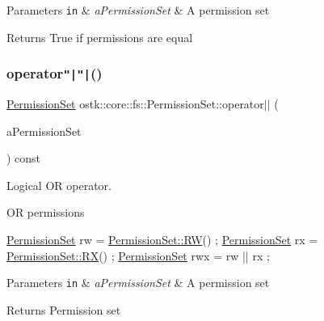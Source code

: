 \begin{DoxyParams}[1]{Parameters}
\mbox{\tt in}  & {\em a\+Permission\+Set} & A permission set \\
\hline
\end{DoxyParams}
\begin{DoxyReturn}{Returns}
True if permissions are equal 
\end{DoxyReturn}
\mbox{\label{classostk_1_1core_1_1fs_1_1_permission_set_a05e00b9a8eb5d7721f413a1b54e15038}} 
\subsubsection{\texorpdfstring{operator\texttt{"|}\texttt{"|}()}{operator||()}}
{\footnotesize\ttfamily \hyperlink{classostk_1_1core_1_1fs_1_1_permission_set}{Permission\+Set} ostk\+::core\+::fs\+::\+Permission\+Set\+::operator$\vert$$\vert$ (\begin{DoxyParamCaption}\item[{const \hyperlink{classostk_1_1core_1_1fs_1_1_permission_set}{Permission\+Set} \&}]{a\+Permission\+Set }\end{DoxyParamCaption}) const}



Logical OR operator. 

OR permissions


\begin{DoxyCode}
\hyperlink{classostk_1_1core_1_1fs_1_1_permission_set_a31c918014e874ceac487e92d0d3ac5a2}{PermissionSet} rw = \hyperlink{classostk_1_1core_1_1fs_1_1_permission_set_ad58bc0911ca89d3c03c089f1647d0315}{PermissionSet::RW}() ;
\hyperlink{classostk_1_1core_1_1fs_1_1_permission_set_a31c918014e874ceac487e92d0d3ac5a2}{PermissionSet} rx = \hyperlink{classostk_1_1core_1_1fs_1_1_permission_set_a42a72499579b9639c112613effb2c128}{PermissionSet::RX}() ;
\hyperlink{classostk_1_1core_1_1fs_1_1_permission_set_a31c918014e874ceac487e92d0d3ac5a2}{PermissionSet} rwx = rw || rx ;
\end{DoxyCode}



\begin{DoxyParams}[1]{Parameters}
\mbox{\tt in}  & {\em a\+Permission\+Set} & A permission set \\
\hline
\end{DoxyParams}
\begin{DoxyReturn}{Returns}
Permission set 
\end{DoxyReturn}
\mbox{\label{classostk_1_1core_1_1fs_1_1_permission_set_a400f8be607966c0a42597f5cef062210}} 
